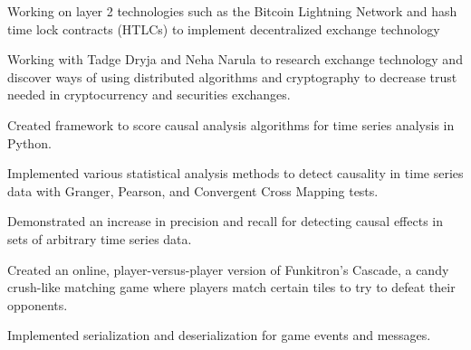 
\begin{tightemize}
  \item Working on layer 2 technologies such as the Bitcoin Lightning Network and hash time lock contracts (HTLCs) to implement decentralized exchange technology
  \item Working with Tadge Dryja and Neha Narula to research exchange technology and discover ways of using
      distributed algorithms and cryptography to decrease trust needed in cryptocurrency and securities exchanges.
\end{tightemize}
\subsectionsep

\begin{tightemize}
\item Created framework to score causal analysis algorithms for time series
  analysis in Python.
\item Implemented various statistical analysis methods to detect causality in
  time series data with Granger, Pearson, and Convergent Cross Mapping tests.
\item Demonstrated an increase in precision and recall for detecting causal effects in sets of
  arbitrary time series data.
\end{tightemize}
\subsectionsep

\begin{tightemize}
\item Created an online, player-versus-player version of Funkitron's Cascade,
  a candy crush-like matching game where players match certain tiles to try to
  defeat their opponents.
\item Implemented serialization and deserialization for game events and messages.
\end{tightemize}
\subsectionsep